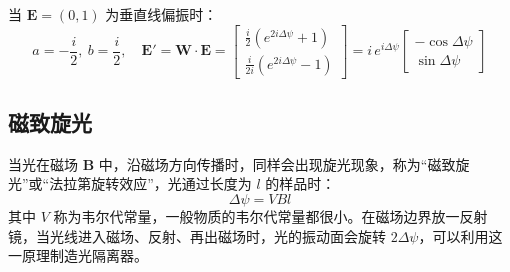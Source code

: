\documentclass[UTF8]{report}
\theoremstyle{MyLineTheoremStyle} %
\theoremstyle{MyBlockTheoremStyle} %
\theoremstyle{MySubsubsectionStyle} %
\begin{document}
当 $\boldsymbol{E} = (0, 1)$ 为垂直线偏振时：
\begin{equation}
a = -\frac{i}{2},\ b = \frac{i}{2},\quad \boldsymbol{E'} = \boldsymbol{W}\cdot \boldsymbol{E} =
\begin{bmatrix}
    \frac{i}{2}\left(e^{2 i \Delta \psi} + 1\right) \\
    \frac{i}{2i}(e^{2 i \Delta \psi} - 1)
\end{bmatrix}
= 
i\, e^{i \Delta \psi}
\begin{bmatrix}
    -\cos \Delta \psi \\
    \sin \Delta \psi
\end{bmatrix}
\end{equation}

\subsection{磁致旋光}
当光在磁场 $\boldsymbol{B}$ 中，沿磁场方向传播时，同样会出现旋光现象，称为“磁致旋光”或“法拉第旋转效应”，光通过长度为 $l$ 的样品时：
\begin{equation}
\Delta \psi = VBl
\end{equation}
其中 $V$ 称为韦尔代常量，一般物质的韦尔代常量都很小。在磁场边界放一反射镜，当光线进入磁场、反射、再出磁场时，光的振动面会旋转 $2\Delta \psi$，可以利用这一原理制造光隔离器。

\end{document}
